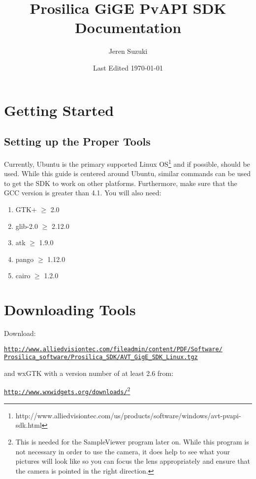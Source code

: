 \documentclass[10pt,a4paper]{article}
\title{Prosilica GiGE PvAPI SDK Documentation}
\author{Jeren Suzuki}
\date{Last Edited \today}
\begin{document}
\maketitle
{}
\tableofcontents
\newpage
{}


\section{Getting Started}
\subsection{Setting up the Proper Tools}

Currently, Ubuntu is the primary supported Linux OS\footnote{http://www.alliedvisiontec.com/us/products/software/windows/avt-pvapi-sdk.html} and if possible, should be used. While this guide is centered around Ubuntu, similar commands can be used to get the SDK to work on other platforms. Furthermore, make sure that the GCC version is greater than 4.1. You will also need:

\begin{enumerate}
    \item GTK$+$ $\ge$ 2.0
    \item glib-2.0 $\ge$ 2.12.0
    \item atk $\ge$ 1.9.0
    \item pango $\ge$ 1.12.0
    \item cairo $\ge$ 1.2.0
\end{enumerate}

\section{Downloading Tools}
Download:


\href{http://www.alliedvisiontec.com/fileadmin/content/PDF/Software/
Prosilica_software/Prosilica\_SDK/AVT_GigE\_SDK_Linux.tgz}{\texttt{http://www.alliedvisiontec.com/fileadmin/content/PDF/Software/\\ 
Prosilica\_software/Prosilica\_SDK/AVT\_GigE\_SDK\_Linux.tgz}}


and wxGTK with a version number of at least 2.6 from:

\href{http://www.wxwidgets.org/downloads/}{\texttt{http://www.wxwidgets.org/downloads/}}\footnote{This is needed for the SampleViewer program later on. While this program is not necessary in order to use the camera, it does help to see what your pictures will look like so you can focus the lens appropriately and ensure that the camera is pointed in the right direction.}
\end{document}
